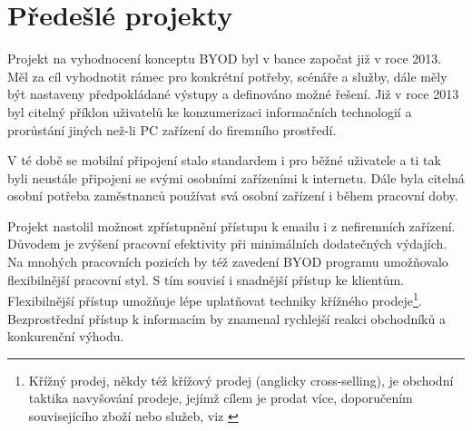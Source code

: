 \begin{table}[]

\centering


\caption{Tabulka aktuálního stavu podpory pro jednotlivé typy zařízení podle typu vlastnictví}
\label{tabulka1}

\end{table}


\section{Předešlé projekty}
Projekt na vyhodnocení konceptu BYOD byl v bance započat již v roce 2013. Měl za cíl vyhodnotit rámec pro konkrétní potřeby, scénáře a služby, dále měly být nastaveny předpokládané výstupy a definováno možné řešení. Již v roce 2013 byl citelný příklon uživatelů ke konzumerizaci informačních technologií a prorůstání jiných než-li PC zařízení do firemního prostředí.

V té době se mobilní připojení stalo standardem i pro běžné uživatele a ti tak byli neustále připojeni se svými osobními zařízeními k internetu. Dále byla citelná osobní potřeba zaměstnanců používat svá osobní zařízení i během pracovní doby.

Projekt nastolil možnost zpřístupnění přístupu k emailu i z nefiremních zařízení. Důvodem je zvýšení pracovní efektivity při minimálních dodatečných výdajích. Na mnohých pracovních pozicích by též zavedení BYOD programu umožňovalo flexibilnější pracovní styl. S tím souvisí i snadnější přístup ke klientům. 
Flexibilnější přístup umožňuje lépe uplatňovat techniky křížného prodeje\footnote{Křížný prodej, někdy též křížový prodej (anglicky cross-selling), je obchodní taktika navyšování prodeje, jejímž cílem je prodat více, doporučením souvisejícího zboží nebo služeb, viz \cite{ManagementMania}}. Bezprostřední přístup k informacím by znamenal rychlejší reakci obchodníků a konkurenční výhodu. 

